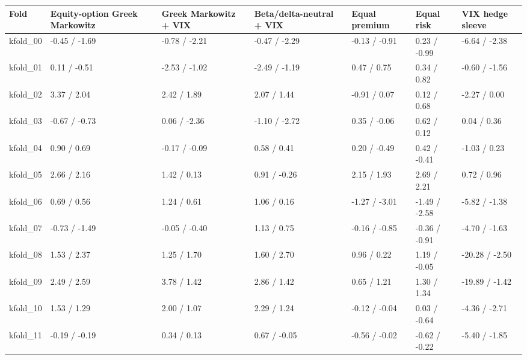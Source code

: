 \begin{tabular}{lllllll}
\toprule
Fold & Equity-option Greek Markowitz & Greek Markowitz + VIX & Beta/delta-neutral + VIX & Equal premium & Equal risk & VIX hedge sleeve \\
\midrule
kfold\_00 & -0.45 / -1.69 & -0.78 / -2.21 & -0.47 / -2.29 & -0.13 / -0.91 & 0.23 / -0.99 & -6.64 / -2.38 \\
kfold\_01 & 0.11 / -0.51 & -2.53 / -1.02 & -2.49 / -1.19 & 0.47 / 0.75 & 0.34 / 0.82 & -0.60 / -1.56 \\
kfold\_02 & 3.37 / 2.04 & 2.42 / 1.89 & 2.07 / 1.44 & -0.91 / 0.07 & 0.12 / 0.68 & -2.27 / 0.00 \\
kfold\_03 & -0.67 / -0.73 & 0.06 / -2.36 & -1.10 / -2.72 & 0.35 / -0.06 & 0.62 / 0.12 & 0.04 / 0.36 \\
kfold\_04 & 0.90 / 0.69 & -0.17 / -0.09 & 0.58 / 0.41 & 0.20 / -0.49 & 0.42 / -0.41 & -1.03 / 0.23 \\
kfold\_05 & 2.66 / 2.16 & 1.42 / 0.13 & 0.91 / -0.26 & 2.15 / 1.93 & 2.69 / 2.21 & 0.72 / 0.96 \\
kfold\_06 & 0.69 / 0.56 & 1.24 / 0.61 & 1.06 / 0.16 & -1.27 / -3.01 & -1.49 / -2.58 & -5.82 / -1.38 \\
kfold\_07 & -0.73 / -1.49 & -0.05 / -0.40 & 1.13 / 0.75 & -0.16 / -0.85 & -0.36 / -0.91 & -4.70 / -1.63 \\
kfold\_08 & 1.53 / 2.37 & 1.25 / 1.70 & 1.60 / 2.70 & 0.96 / 0.22 & 1.19 / -0.05 & -20.28 / -2.50 \\
kfold\_09 & 2.49 / 2.59 & 3.78 / 1.42 & 2.86 / 1.42 & 0.65 / 1.21 & 1.30 / 1.34 & -19.89 / -1.42 \\
kfold\_10 & 1.53 / 1.29 & 2.00 / 1.07 & 2.29 / 1.24 & -0.12 / -0.04 & 0.03 / -0.64 & -4.36 / -2.71 \\
kfold\_11 & -0.19 / -0.19 & 0.34 / 0.13 & 0.67 / -0.05 & -0.56 / -0.02 & -0.62 / -0.22 & -5.40 / -1.85 \\
\bottomrule
\end{tabular}
